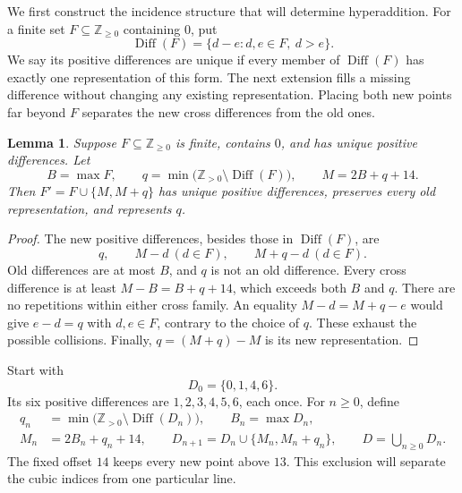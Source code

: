 \documentclass[11pt]{article}
\newtheorem{lemma}[theorem]{Lemma}
\theoremstyle{remark}
\newcommand{\Z}{\mathbb Z}
\DeclareMathOperator{\Diff}{Diff}
\begin{document}
We first construct the incidence structure that will determine
hyperaddition. For a finite set $F\subseteq\Z_{\ge0}$ containing $0$, put
\[
 \Diff(F)=\{d-e:d,e\in F,\ d>e\}.
\]
We say its positive differences are unique if every member of
$\Diff(F)$ has exactly one representation of this form.
The next extension fills a missing difference without changing any
existing representation. Placing both new points far beyond $F$
separates the new cross differences from the old ones.
\begin{lemma}\label{lem:extension}
Suppose $F\subseteq\Z_{\ge0}$ is finite, contains $0$, and has unique
positive differences. Let
\[
 B=\max F,\qquad
 q=\min\bigl(\Z_{>0}\setminus\Diff(F)\bigr),\qquad
 M=2B+q+14.
\]
Then $F'=F\cup\{M,M+q\}$ has unique positive differences, preserves
every old representation, and represents $q$.
\end{lemma}

\begin{proof}
The new positive differences, besides those in $\Diff(F)$, are
\[
 q,\qquad M-d\ (d\in F),\qquad M+q-d\ (d\in F).
\]
Old differences are at most $B$, and $q$ is not an old difference.
Every cross difference is at least
$M-B=B+q+14$, which exceeds both $B$ and $q$.
There are no repetitions within either cross family. An equality
$M-d=M+q-e$ would give $e-d=q$ with $d,e\in F$, contrary to the
choice of $q$. These exhaust the possible collisions. Finally,
$q=(M+q)-M$ is its new representation.
\end{proof}

Start with
\begin{equation}\label{eq:seed}
 D_0=\{0,1,4,6\}.
\end{equation}
Its six positive differences are $1,2,3,4,5,6$, each once.
For $n\ge0$, define
\begin{equation}\label{eq:recursion}
 \begin{split}
 q_n&=\min\bigl(\Z_{>0}\setminus\Diff(D_n)\bigr),\qquad
 B_n=\max D_n,\\
 M_n&=2B_n+q_n+14,\qquad
 D_{n+1}=D_n\cup\{M_n,M_n+q_n\},\qquad
 D=\bigcup_{n\ge0}D_n.
 \end{split}
\end{equation}
The fixed offset $14$ keeps every new point above $13$.
This exclusion will separate the cubic indices from one particular line.
\end{document}
